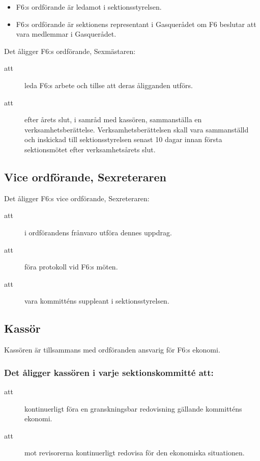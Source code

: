 \documentclass[a4paper]{article}
\begin{document}
\begin{foreningenv}{\forening{}}
    \begin{itemize}
        \item F6:s ordförande är ledamot i sektionsstyrelsen.
        \item F6:s ordförande är sektionens representant i Gasquerådet om F6 beslutar att vara medlemmar i Gasquerådet.
    \end{itemize}
    
    Det åligger F6:s ordförande, Sexmästaren:
    \begin{description}
        \item[att] leda F6:s arbete och tillse att deras åligganden utförs.
        \item[att] efter årets slut, i samråd med kassören, sammanställa en verksamhetsberättelse. Verksamhetsberättelsen skall vara sammanställd och inskickad till sektionsstyrelsen senast 10 dagar innan första sektionsmötet efter verksamhetsårets slut.
    \end{description}
    
    \subsection{Vice ordförande, Sexreteraren}
    Det åligger F6:s vice ordförande, Sexreteraren:
    \begin{description}
        \item[att] i ordförandens frånvaro utföra dennes uppdrag.
        \item[att] föra protokoll vid F6:s möten.
        \item[att] vara kommitténs suppleant i sektionsstyrelsen.
    \end{description}
    
    \subsection{Kassör}
    Kassören är tillsammans med ordföranden ansvarig för F6:s ekonomi.
    
    \subsubsection{Det åligger kassören i varje sektionskommitté att:}
    \begin{description}
        \item[att] kontinuerligt föra en granskningsbar redovisning gällande kommitténs ekonomi.
        \item[att] mot revisorerna kontinuerligt redovisa för den ekonomiska situationen.
    \end{description}
    

\end{foreningenv}
\end{document}
